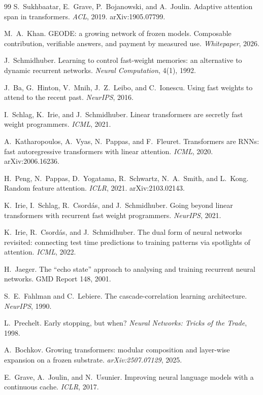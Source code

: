 \documentclass[11pt]{article}
\begin{document}
\begin{thebibliography}{99}
S.~Sukhbaatar, E.~Grave, P.~Bojanowski, and A.~Joulin.
Adaptive attention span in transformers.
\emph{ACL}, 2019. arXiv:1905.07799.

M.~A.~Khan.
GEODE: a growing network of frozen models. Composable
contribution, verifiable answers, and payment by measured use.
\emph{Whitepaper}, 2026.

J.~Schmidhuber.
Learning to control fast-weight memories: an alternative to dynamic
recurrent networks.
\emph{Neural Computation}, 4(1), 1992.

J.~Ba, G.~Hinton, V.~Mnih, J.~Z.~Leibo, and C.~Ionescu.
Using fast weights to attend to the recent past.
\emph{NeurIPS}, 2016.

I.~Schlag, K.~Irie, and J.~Schmidhuber.
Linear transformers are secretly fast weight programmers.
\emph{ICML}, 2021.

A.~Katharopoulos, A.~Vyas, N.~Pappas, and F.~Fleuret.
Transformers are RNNs: fast autoregressive transformers with
linear attention.
\emph{ICML}, 2020. arXiv:2006.16236.

H.~Peng, N.~Pappas, D.~Yogatama, R.~Schwartz, N.~A.~Smith, and
L.~Kong.
Random feature attention.
\emph{ICLR}, 2021. arXiv:2103.02143.

K.~Irie, I.~Schlag, R.~Csord\'as, and J.~Schmidhuber.
Going beyond linear transformers with recurrent fast weight
programmers.
\emph{NeurIPS}, 2021.

K.~Irie, R.~Csord\'as, and J.~Schmidhuber.
The dual form of neural networks revisited: connecting test time
predictions to training patterns via spotlights of attention.
\emph{ICML}, 2022.

H.~Jaeger.
The ``echo state'' approach to analysing and training recurrent
neural networks.
GMD Report 148, 2001.

S.~E.~Fahlman and C.~Lebiere.
The cascade-correlation learning architecture.
\emph{NeurIPS}, 1990.

L.~Prechelt.
Early stopping, but when?
\emph{Neural Networks: Tricks of the Trade}, 1998.

A.~Bochkov.
Growing transformers: modular composition and layer-wise
expansion on a frozen substrate.
\emph{arXiv:2507.07129}, 2025.

E.~Grave, A.~Joulin, and N.~Usunier.
Improving neural language models with a continuous cache.
\emph{ICLR}, 2017.


\end{thebibliography}
\end{document}
